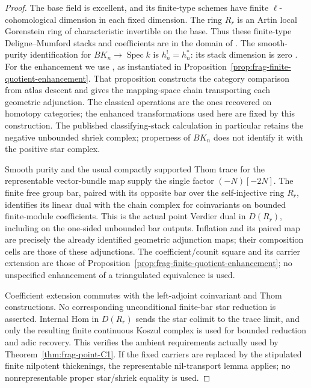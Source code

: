 \documentclass[11pt]{article}
\theoremstyle{definition}
\theoremstyle{remark}
\begin{document}
\begin{proof}
The base field is excellent, and its finite-type schemes have finite
$\ell$-cohomological dimension in each fixed dimension.  The ring
$R_r$ is an Artin local Gorenstein ring of characteristic invertible
on the base.  Thus these finite-type Deligne--Mumford stacks and
coefficients are in the domain of \cite{LaszloOlssonFinite}.
The smooth-purity identification for $BK_n\to\operatorname{Spec}k$
is $h_n^!=h_n^*$: its stack dimension is zero
\cite[Corollary 4.6.2]{LaszloOlssonFinite}.
For the enhancement we use \cite[\S6.2, Theorems 6.2.9 and
6.2.13]{LiuZhengEnhanced}, as instantiated in
Proposition~\ref{prop:frag-finite-quotient-enhancement}.  That
proposition constructs the category comparison from atlas descent
and gives the mapping-space chain transporting each geometric
adjunction.  The classical operations are the ones recovered on
homotopy categories; the enhanced transformations used here are
fixed by this construction.
The published classifying-stack calculation
\cite[Example 4.9.2]{LaszloOlssonFinite} in particular retains the
negative unbounded shriek complex; properness of $BK_n$ does not
identify it with the positive star complex.

Smooth purity and the usual compactly supported Thom trace for the
representable vector-bundle map supply the single factor
$(-N)[-2N]$.  The finite free group bar, paired with its opposite
bar over the self-injective ring $R_r$, identifies its linear dual
with the chain complex for coinvariants on bounded finite-module
coefficients.  This is the actual point Verdier dual in $D(R_r)$,
including on the one-sided unbounded bar outputs.  Inflation and
its paired map are precisely the already identified geometric
adjunction maps; their composition cells are those of these
adjunctions.  The coefficient/counit square and its carrier extension are
those of Proposition~\ref{prop:frag-finite-quotient-enhancement};
no unspecified enhancement of a triangulated equivalence is used.

Coefficient extension commutes with the left-adjoint coinvariant
and Thom constructions.  No corresponding unconditional finite-bar
star reduction is asserted.  Internal Hom in $D(R_r)$ sends the
star colimit to the trace limit, and only the resulting finite
continuous Koszul complex is used for bounded reduction and adic
recovery.  This verifies the ambient requirements actually used
by Theorem~\ref{thm:frag-point-C1}.  If the fixed carriers are replaced by the stipulated
finite nilpotent thickenings, the representable nil-transport lemma
applies; no nonrepresentable proper star/shriek equality is used.
\end{proof}
\end{document}
